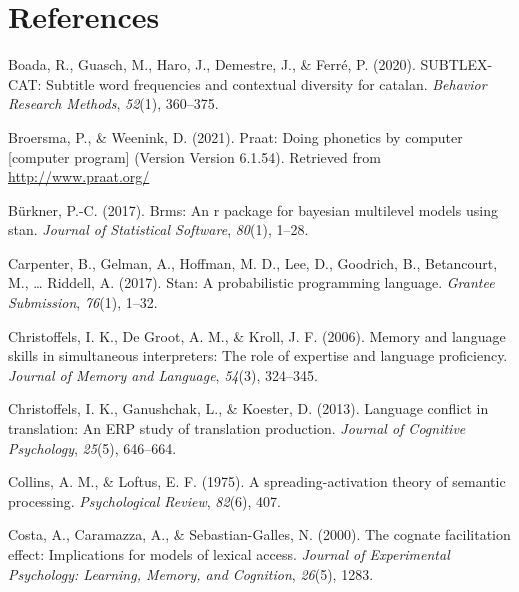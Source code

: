 \documentclass[
  english,
  man,floatsintext]{apa6}
\newlength{\cslhangindent}
\newenvironment{CSLReferences}[2] %
 {%
  \setlength{\parindent}{0pt}
  \ifodd #1 \everypar{\setlength{\hangindent}{\cslhangindent}}\ignorespaces\fi
  \ifnum #2 > 0
  \setlength{\parskip}{#2\baselineskip}
  \fi
 }%
 {}
\begin{document}
\hypertarget{references}{%
\section{References}\label{references}}

\begingroup
\setlength{\parindent}{-0.5in}
\setlength{\leftskip}{0.5in}

\hypertarget{refs}{}
\begin{CSLReferences}{1}{0}
\leavevmode{}%
Boada, R., Guasch, M., Haro, J., Demestre, J., \& Ferré, P. (2020). SUBTLEX-CAT: Subtitle word frequencies and contextual diversity for catalan. \emph{Behavior Research Methods}, \emph{52}(1), 360--375.

\leavevmode{}%
Broersma, P., \& Weenink, D. (2021). Praat: Doing phonetics by computer {[}computer program{]} (Version Version 6.1.54). Retrieved from \url{http://www.praat.org/}

\leavevmode{}%
Bürkner, P.-C. (2017). Brms: An r package for bayesian multilevel models using stan. \emph{Journal of Statistical Software}, \emph{80}(1), 1--28.

\leavevmode{}%
Carpenter, B., Gelman, A., Hoffman, M. D., Lee, D., Goodrich, B., Betancourt, M., \ldots{} Riddell, A. (2017). Stan: A probabilistic programming language. \emph{Grantee Submission}, \emph{76}(1), 1--32.

\leavevmode{}%
Christoffels, I. K., De Groot, A. M., \& Kroll, J. F. (2006). Memory and language skills in simultaneous interpreters: The role of expertise and language proficiency. \emph{Journal of Memory and Language}, \emph{54}(3), 324--345.

\leavevmode{}%
Christoffels, I. K., Ganushchak, L., \& Koester, D. (2013). Language conflict in translation: An ERP study of translation production. \emph{Journal of Cognitive Psychology}, \emph{25}(5), 646--664.

\leavevmode{}%
Collins, A. M., \& Loftus, E. F. (1975). A spreading-activation theory of semantic processing. \emph{Psychological Review}, \emph{82}(6), 407.

\leavevmode{}%
Costa, A., Caramazza, A., \& Sebastian-Galles, N. (2000). The cognate facilitation effect: Implications for models of lexical access. \emph{Journal of Experimental Psychology: Learning, Memory, and Cognition}, \emph{26}(5), 1283.


\end{CSLReferences}
\end{document}

